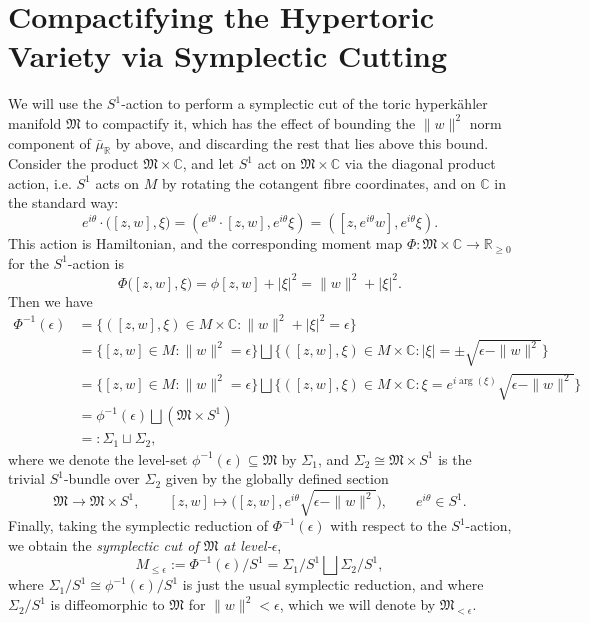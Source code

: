 \documentclass{article}
\newcommand{\st}{\ensuremath{:}}%
\newcommand{\ra}{\rightarrow}
\newcommand{\lbracket}{\left(}
\newcommand{\rbracket}{\right)}
\newcommand{\e}{\epsilon}
\newcommand{\HK}{hyperk\"ahler }
\newcommand{\RR}{\mathbb{R}}
\newcommand{\CC}{\mathbb{C}}
\newcommand{\mf}[1]{\mathfrak{#1}}
\begin{document}
	\section{Compactifying the Hypertoric Variety via Symplectic Cutting}
	
	We will use the $S^{1}$-action to perform a symplectic cut of the toric \HK manifold $\mf{M}$ to compactify it, which has the effect of bounding the $\|w\|^{2}$ norm component of $\bar{\mu}_{\RR}$ by above, and discarding the rest that lies above this bound. Consider the product $\mf{M} \times \CC$,  and let $S^{1}$ act on $\mf{M} \times \CC$ via the diagonal product action, i.e. $S^{1}$ acts on $M$ by rotating the cotangent fibre coordinates, and on $\CC$ in the standard way:
	$$
	e^{i\theta} \cdot \big( [z,w], \xi   \big) = \left( e^{i\theta} \cdot [z,w], e^{i\theta}\xi\right) = \left( [z,e^{i\theta}w], e^{i\theta}\xi\right).
	$$
	This action is Hamiltonian, and the corresponding moment map $\Phi : \mf{M} \times \CC \ra \RR_{\geq 0}$ for the $S^{1}$-action is
	\[
		\Phi\big( [z,w], \xi  \big) = \phi[z,w] + |\xi|^{2} = \|w\|^{2} + |\xi|^{2}.
	\]
	Then we have
	\begin{equation*}
		\begin{split}
			\Phi^{-1}(\e) &= \big\{ ([z,w],\xi) \in M \times \CC \st \|w\|^{2} + |\xi|^{2} = \e    \big\} \\
			&= \big\{ [z,w] \in M \st \|w\|^{2} = \e    \big\} \bigsqcup \big\{ ([z,w],\xi) \in M \times \CC \st |\xi| = \pm\sqrt{\e - \|w\|^{2}} \big\} \\
			&= \big\{ [z,w] \in M \st \|w\|^{2} = \e    \big\} \bigsqcup \big\{ ([z,w],\xi) \in M \times \CC \st \xi = e^{i\arg(\xi)}\sqrt{\e - \|w\|^{2}}    \big\} \\
			&= \phi^{-1}(\e) \bigsqcup \lbracket \mf{M} \times S^{1}\rbracket \\
			&=: \Sigma_{1} \sqcup \Sigma_{2},
		\end{split}
	\end{equation*}
	where we denote the level-set $\phi^{-1}(\e) \subseteq \mf{M}$ by $\Sigma_{1}$, and $\Sigma_{2} \cong \mf{M} \times S^{1}$ is the trivial $S^{1}$-bundle over $\Sigma_{2}$ given by the globally defined section
	\begin{equation*}
		\mf{M} \rightarrow \mf{M} \times S^{1}, \qquad [z,w] \longmapsto \big( [z,w], e^{i\theta}\sqrt{\e - \|w\|^{2}}\big), \qquad e^{i\theta} \in S^{1}.
	\end{equation*}
	Finally, taking the symplectic reduction of $\Phi^{-1}(\e)$ with respect to the $S^{1}$-action, we obtain the \emph{symplectic cut of $\mf{M}$ at level-$\e$},
	\begin{equation*}
		M_{\leq \e} := \Phi^{-1}(\e)/S^{1} = \Sigma_{1}/S^{1} \bigsqcup \Sigma_{2}/S^{1},
	\end{equation*}
	where $\Sigma_{1}/S^{1} \cong \phi^{-1}(\e)/S^{1}$ is just the usual symplectic reduction, and where $\Sigma_{2}/S^{1}$ is diffeomorphic to $\mf{M}$ for $\|w\|^{2} < \e$, which we will denote by $\mf{M}_{<\epsilon}$.
	
\end{document}
